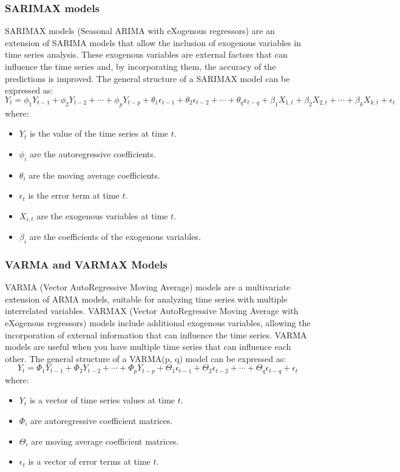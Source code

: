\subsubsection{SARIMAX models}

SARIMAX models (Seasonal ARIMA with eXogenous regressors) are an extension of SARIMA models that allow the inclusion of exogenous variables in time series analysis. These exogenous variables are external factors that can influence the time series and, by incorporating them, the accuracy of the predictions is improved. The general structure of a SARIMAX model can be expressed as:
\[
Y_t = \phi_1 Y_{t-1} + \phi_2 Y_{t-2} + \cdots + \phi_p Y_{t-p} + \theta_1 \epsilon_{t-1} + \theta_2 \epsilon_{t-2} + \cdots + \theta_q \epsilon_{t-q} + \beta_1 X_{1,t} + \beta_2 X_{2,t} + \cdots + \beta_k X_{k,t} + \epsilon_t
\]
where:
\begin{itemize}
    \item \( Y_t \) is the value of the time series at time \( t \).
    \item \( \phi_i \) are the autoregressive coefficients.
    \item \( \theta_i \) are the moving average coefficients.
    \item \( \epsilon_t \) is the error term at time \( t \).
    \item \( X_{i,t} \) are the exogenous variables at time \( t \).
    \item \( \beta_i \) are the coefficients of the exogenous variables.
\end{itemize}
\vspace{10pt}

\subsubsection{VARMA and VARMAX Models}

VARMA (Vector AutoRegressive Moving Average) models are a multivariate extension of ARMA models, suitable for analyzing time series with multiple interrelated variables. VARMAX (Vector AutoRegressive Moving Average with eXogenous regressors) models include additional exogenous variables, allowing the incorporation of external information that can influence the time series. VARMA models are useful when you have multiple time series that can influence each other. The general structure of a VARMA(p, q) model can be expressed as:
\[
Y_t = \Phi_1 Y_{t-1} + \Phi_2 Y_{t-2} + \cdots + \Phi_p Y_{t-p} + \Theta_1 \epsilon_{t-1} + \Theta_2 \epsilon_{t-2} + \cdots + \Theta_q \epsilon_{t-q} + \epsilon_t
\]
where:
\begin{itemize}
    \item \( Y_t \) is a vector of time series values at time \( t \).
    \item \( \Phi_i \) are autoregressive coefficient matrices.
    \item \( \Theta_i \) are moving average coefficient matrices.
    \item \( \epsilon_t \) is a vector of error terms at time \( t \).
\end{itemize}
\vspace{10pt}

